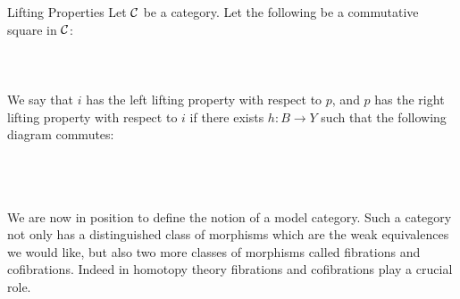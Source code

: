 \documentclass[a4paper]{article}
\begin{document}
\begin{defn}{Lifting Properties}{} Let $\mathcal{C}$ be a category. Let the following be a commutative square in $\mathcal{C}$: \\~\\
\\~\\
We say that $i$ has the left lifting property with respect to $p$, and $p$ has the right lifting property with respect to $i$ if there exists $h:B\to Y$ such that the following diagram commutes: \\~\\
\\~\\
\end{defn}

We are now in position to define the notion of a model category. Such a category not only has a distinguished class of morphisms which are the weak equivalences we would like, but also two more classes of morphisms called fibrations and cofibrations. Indeed in homotopy theory fibrations and cofibrations play a crucial role. 
\end{document}
